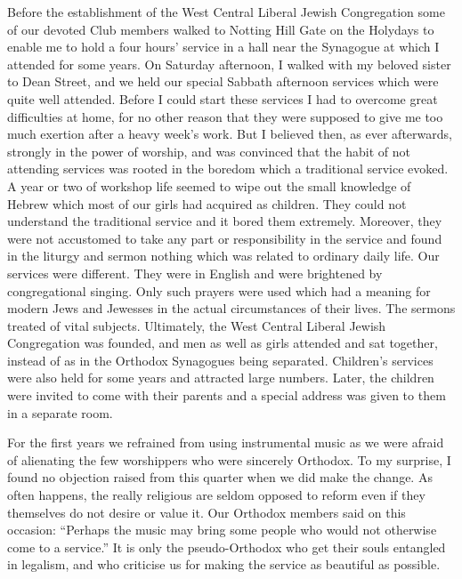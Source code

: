 \documentclass[14pt, article, extrafontsizes, twopage, a4paper]{memoir}
\begin{document}
Before the establishment of the West Central Liberal
Jewish Congregation some of our devoted Club members
walked to Notting Hill Gate on the Holydays to enable
me to hold a four hours’ service in a hall near the Synagogue
at which I attended for some years. On Saturday
afternoon, I walked with my beloved sister to Dean
Street, and we held our special Sabbath afternoon services
which were quite well attended. Before I could start
these services I had to overcome great difficulties at home,
for no other reason that they were supposed to give me too
much exertion after a heavy week’s work. But I believed
then, as ever afterwards, strongly in the power of worship,
and was convinced that the habit of not attending services
was rooted in the boredom which a traditional service
evoked. A year or two of workshop life seemed to wipe
out the small knowledge of Hebrew which most of our
girls had acquired as children. They could not understand
the traditional service and it bored them extremely.
Moreover, they were not accustomed to take any part or
responsibility in the service and found in the liturgy and
sermon nothing which was related to ordinary daily life.
Our services were different. They were in English and
were brightened by congregational singing. Only such
prayers were used which had a meaning for modern
Jews and Jewesses in the actual circumstances of their
lives. The sermons treated of vital subjects. Ultimately,
the West Central Liberal Jewish Congregation was
founded, and men as well as girls attended and sat together,
instead of as in the Orthodox Synagogues being
separated. Children’s services were also held for some
years and attracted large numbers. Later, the children
were invited to come with their parents and a special
address was given to them in a separate room.

For the first years we refrained from using instrumental
music as we were afraid of alienating the few worshippers
who were sincerely Orthodox. To my surprise, I found
no objection raised from this quarter when we did make
the change. As often happens, the really religious are
seldom opposed to reform even if they themselves do not
desire or value it. Our Orthodox members said on this
occasion: “Perhaps the music may bring some people
who would not otherwise come to a service.” It is only
the pseudo-Orthodox who get their souls entangled in
legalism, and who criticise us for making the service as
beautiful as possible.
\end{document}
